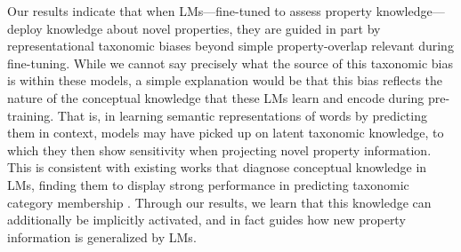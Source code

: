 \documentclass[10pt,letterpaper]{article}
\begin{document}
Our results indicate that when LMs---fine-tuned to assess property knowledge---deploy knowledge about novel properties, they are guided in part by representational taxonomic biases beyond simple property-overlap relevant during fine-tuning. While we cannot say precisely what the source of this taxonomic bias is within these models, a simple explanation would be that this bias reflects the nature of the conceptual knowledge that these LMs learn and encode during pre-training. 
That is, in learning semantic representations of words by predicting them in context, models may have picked up on latent taxonomic knowledge, to which they then show sensitivity when projecting novel property information. 
This is consistent with existing works that diagnose  conceptual knowledge in LMs, finding them to display strong performance in predicting taxonomic category membership \citep{da-kasai-2019-cracking,bhatia2020transformer}. 
Through our results, we learn that this knowledge can additionally be implicitly activated, and in fact guides how new property information is generalized by LMs.
\end{document}
